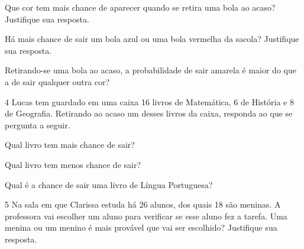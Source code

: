\begin{escolha}
\item
  Que cor tem mais chance de aparecer quando se retira uma bola ao acaso? Justifique sua resposta.


\item
  Há mais chance de sair um bola azul ou uma bola vermelha da sacola? Justifique sua resposta.


\item
  Retirando-se uma bola ao acaso, a probabilidade de sair amarela é maior do que a de sair qualquer
  outra cor?

\end{escolha}


\num{4} Lucas tem guardado em uma caixa 16 livros de Matemática, 6 de História e
8 de Geografia. Retirando ao acaso um desses livros da caixa, responda ao que se pergunta a seguir.

\begin{escolha}
\item
  Qual livro tem mais chance de sair?


\item
  Qual livro tem menos chance de sair?


\item
  Qual é a chance de sair uma livro de Língua Portuguesa?

\end{escolha}

\pagebreak
\num{5} Na sala em que Clarissa estuda há 26 alunos, dos quais 18 são meninas. A
professora vai escolher um aluno para verificar se esse aluno fez a tarefa.
Uma menina ou um menino é mais provável que vai ser escolhido? Justifique sua resposta.

\begin{mdframed}[linewidth=2pt,linecolor=salmao,roundcorner=2pt]



\end{mdframed}

